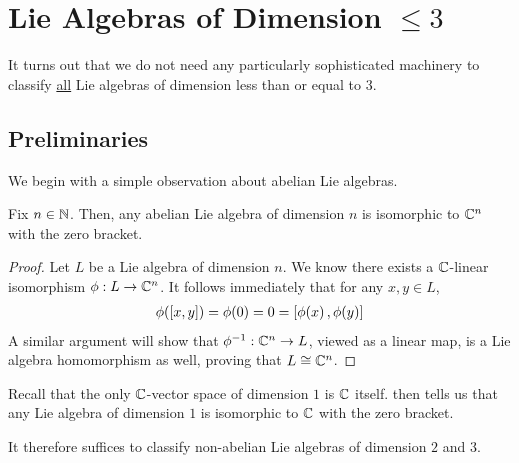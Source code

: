 \section{Lie Algebras of Dimension $\leq 3$}

It turns out that we do not need any particularly sophisticated machinery to classify \underline{all} Lie algebras of dimension less than or equal to $3$.

\subsection{Preliminaries}

We begin with a simple observation about abelian Lie algebras.

\begin{proposition}\label{Ch1:Prop:Abelian_Lie_Algebras_Iso}
    Fix $n \in \mathbb{N}$. Then, any abelian Lie algebra of dimension $n$ is isomorphic to $\mathbb{C}^n$ with the zero bracket.
\end{proposition}
\begin{proof}
    Let $L$ be a Lie algebra of dimension $n$. We know there exists a $\mathbb{C}$-linear isomorphism $\phi : L \to \mathbb{C}^n$. It follows immediately that for any $x, y \in L$,
    \begin{align*}
        \phi\!\left( \left[ x, y \right] \right) = \phi\!\left( 0 \right) = 0 = \left[ \phi\!\left( x \right), \phi\!\left( y \right) \right]
    \end{align*}
    A similar argument will show that $\phi^{-1} : \mathbb{C}^n \to L$, viewed as a linear map, is a Lie algebra homomorphism as well, proving that $L \cong \mathbb{C}^n$.
\end{proof}

Recall that the only $\mathbb{C}$-vector space of dimension $1$ is $\mathbb{C}$ itself.  then tells us that any Lie algebra of dimension $1$ is isomorphic to $\mathbb{C}$ with the zero bracket.

It therefore suffices to classify non-abelian Lie algebras of dimension $2$ and $3$.
